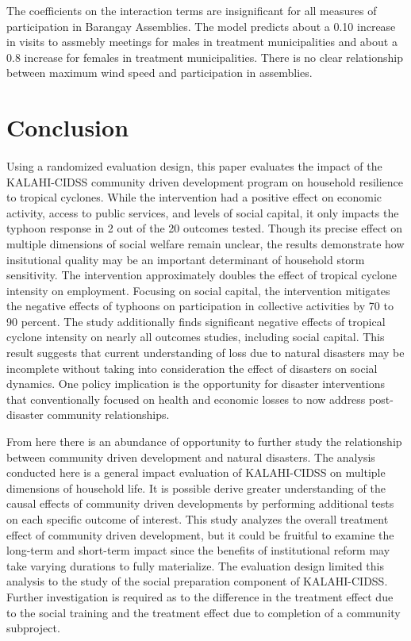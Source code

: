 \documentclass[12pt]{article}
\begin{document}
	The coefficients on the interaction terms are insignificant for all measures of participation in Barangay Assemblies. The model predicts about a 0.10 increase in visits to assmebly meetings for males in treatment municipalities and about a 0.8 increase for females in treatment municipalities. There is no clear relationship between maximum wind speed and participation in assemblies.
	
\section{Conclusion}

	\paragraph{ } Using a randomized evaluation design, this paper evaluates the impact of the KALAHI-CIDSS community driven development program on household resilience to tropical cyclones. While the intervention had a positive effect on economic activity, access to public services, and levels of social capital, it only impacts the typhoon response in 2 out of the 20 outcomes tested. Though its precise effect on multiple dimensions of social welfare remain unclear, the results demonstrate how insitutional quality may be an important determinant of household storm sensitivity. The intervention approximately doubles the effect of tropical cyclone intensity on employment. Focusing on social capital, the intervention mitigates the negative effects of typhoons on participation in collective activities by 70 to 90 percent. The study additionally finds significant negative effects of tropical cyclone intensity on nearly all outcomes studies, including social capital. This result suggests that current understanding of loss due to natural disasters may be incomplete without taking into consideration the effect of disasters on social dynamics. One policy implication is the opportunity for disaster interventions that conventionally focused on health and economic losses to now address post-disaster community relationships. 

	From here there is an abundance of opportunity to further study the relationship between community driven development and natural disasters. The analysis conducted here is a general impact evaluation of KALAHI-CIDSS on multiple dimensions of household life. It is possible derive greater understanding of the causal effects of community driven developments by performing additional tests on each specific outcome of interest. This study analyzes the overall treatment effect of community driven development, but it could be fruitful to examine the long-term and short-term impact since the benefits of institutional reform may take varying durations to fully materialize. The evaluation design limited this analysis to the study of the social preparation component of KALAHI-CIDSS. Further investigation is required as to the difference in the treatment effect due to the social training and the treatment effect due to completion of a community subproject.  
\end{document}
